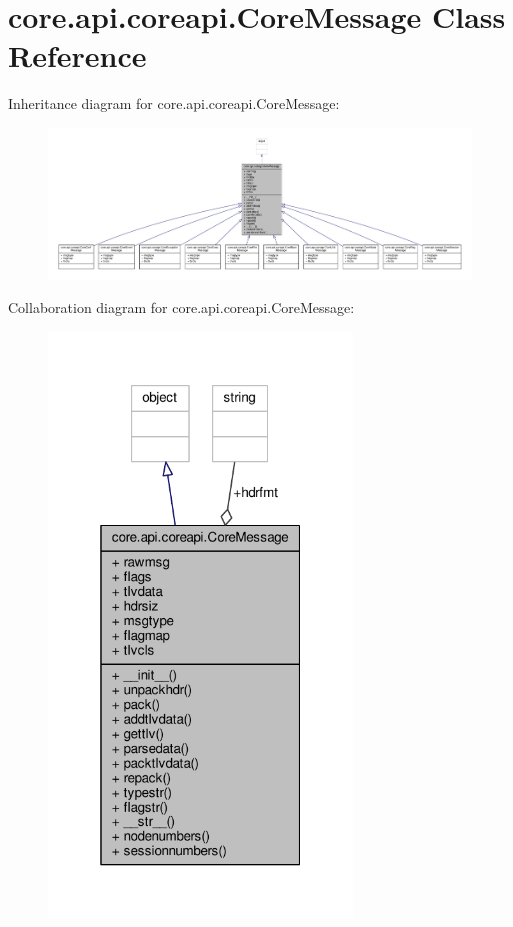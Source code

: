 \hypertarget{classcore_1_1api_1_1coreapi_1_1_core_message}{\section{core.\+api.\+coreapi.\+Core\+Message Class Reference}
\label{classcore_1_1api_1_1coreapi_1_1_core_message}
}


Inheritance diagram for core.\+api.\+coreapi.\+Core\+Message\+:
\nopagebreak
\begin{figure}[H]
\begin{center}
\leavevmode
\includegraphics[width=350pt]{classcore_1_1api_1_1coreapi_1_1_core_message__inherit__graph}
\end{center}
\end{figure}


Collaboration diagram for core.\+api.\+coreapi.\+Core\+Message\+:
\nopagebreak
\begin{figure}[H]
\begin{center}
\leavevmode
\includegraphics[width=229pt]{classcore_1_1api_1_1coreapi_1_1_core_message__coll__graph}
\end{center}
\end{figure}
